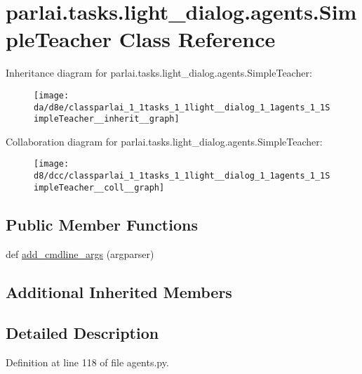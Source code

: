 \hypertarget{classparlai_1_1tasks_1_1light__dialog_1_1agents_1_1SimpleTeacher}{}\section{parlai.\+tasks.\+light\+\_\+dialog.\+agents.\+Simple\+Teacher Class Reference}
\label{classparlai_1_1tasks_1_1light__dialog_1_1agents_1_1SimpleTeacher}


Inheritance diagram for parlai.\+tasks.\+light\+\_\+dialog.\+agents.\+Simple\+Teacher\+:
\nopagebreak
\begin{figure}[H]
\begin{center}
\leavevmode
\texttt{[image: da/d8e/classparlai\_1\_1tasks\_1\_1light\_\_dialog\_1\_1agents\_1\_1SimpleTeacher\_\_inherit\_\_graph]}
\end{center}
\end{figure}


Collaboration diagram for parlai.\+tasks.\+light\+\_\+dialog.\+agents.\+Simple\+Teacher\+:
\nopagebreak
\begin{figure}[H]
\begin{center}
\leavevmode
\texttt{[image: d8/dcc/classparlai\_1\_1tasks\_1\_1light\_\_dialog\_1\_1agents\_1\_1SimpleTeacher\_\_coll\_\_graph]}
\end{center}
\end{figure}
\subsection*{Public Member Functions}
\begin{DoxyCompactItemize}
\item 
def \hyperlink{classparlai_1_1tasks_1_1light__dialog_1_1agents_1_1SimpleTeacher_aeb34b661b221d35efef6f24ba5c27e48}{add\+\_\+cmdline\+\_\+args} (argparser)
\end{DoxyCompactItemize}
\subsection*{Additional Inherited Members}


\subsection{Detailed Description}


Definition at line 118 of file agents.\+py.



